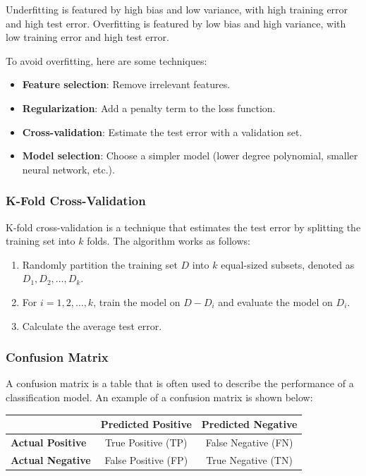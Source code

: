 \documentclass[a4paper,12pt]{article}
\begin{document}
Underfitting is featured by high bias and low variance, with high training error and high test error. Overfitting is featured by low bias and high variance, with low training error and high test error.

To avoid overfitting, here are some techniques:
\begin{itemize}
  \item \textbf{Feature selection}: Remove irrelevant features.
  \item \textbf{Regularization}: Add a penalty term to the loss function.
  \item \textbf{Cross-validation}: Estimate the test error with a validation set.
  \item \textbf{Model selection}: Choose a simpler model (lower degree polynomial, smaller neural network, etc.).
\end{itemize}

\subsubsection{K-Fold Cross-Validation}

K-fold cross-validation is a technique that estimates the test error by splitting the training set into $k$ folds. The algorithm works as follows:
\begin{enumerate}
  \item Randomly partition the training set $D$ into $k$ equal-sized subsets, denoted as $D_1, D_2, \ldots, D_k$.
  \item For $i = 1, 2, \ldots, k$, train the model on $D - D_i$ and evaluate the model on $D_i$.
  \item Calculate the average test error.
\end{enumerate}

\subsubsection{Confusion Matrix}

A confusion matrix is a table that is often used to describe the performance of a classification model. An example of a confusion matrix is shown below:
\begin{table}[H]
  \centering
  \begin{tabular}{lcc}
    \toprule
    & \textbf{Predicted Positive} & \textbf{Predicted Negative} \\
    \midrule
    \textbf{Actual Positive} & True Positive (TP) & False Negative (FN) \\
    \textbf{Actual Negative} & False Positive (FP) & True Negative (TN) \\
    \bottomrule
  \end{tabular}
\end{table}
\end{document}
